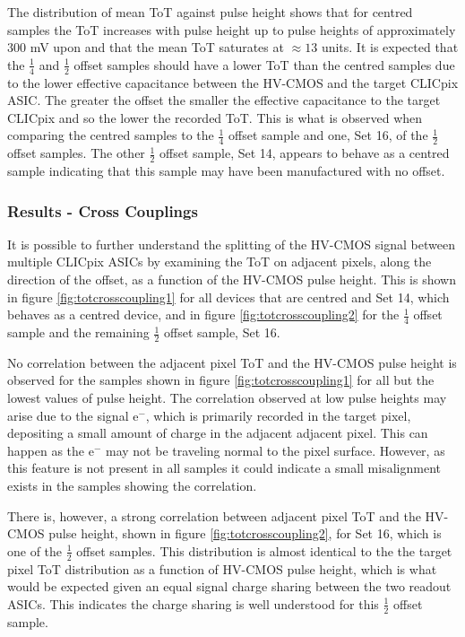 The distribution of mean ToT against pulse height shows that for centred samples the ToT increases with pulse height up to pulse heights of approximately 300 mV upon and that the mean ToT saturates at $\approx 13$ units.  It is expected that the $\frac{1}{4}$ and $\frac{1}{2}$ offset samples should have a lower ToT than the centred samples due to the lower effective capacitance between the HV-CMOS and the target CLICpix ASIC.  The greater the offset the smaller the effective capacitance to the target CLICpix and so the lower the recorded ToT.  This is what is observed when comparing the centred samples to the $\frac{1}{4}$ offset sample and one, Set 16, of the $\frac{1}{2}$ offset samples.  The other $\frac{1}{2}$ offset sample, Set 14, appears to behave as a centred sample indicating that this sample may have been manufactured with no offset.  


\subsubsection{Results -  Cross Couplings}
It is possible to further understand the splitting of the HV-CMOS signal between multiple CLICpix ASICs by examining the ToT on adjacent pixels, along the direction of the offset, as a function of the HV-CMOS pulse height.  This is shown in figure \ref{fig:totcrosscoupling1} for all devices that are centred and Set 14, which behaves as a centred device, and in figure \ref{fig:totcrosscoupling2} for the $\frac{1}{4}$ offset sample and the remaining $\frac{1}{2}$ offset sample, Set 16.  

No correlation between the adjacent pixel ToT and the HV-CMOS pulse height is observed for the samples shown in figure \ref{fig:totcrosscoupling1} for all but the lowest values of pulse height.  The correlation observed at low pulse heights may arise due to the signal $\text{e}^{-}$, which is primarily recorded in the target pixel, depositing a small amount of charge in the adjacent adjacent pixel.  This can happen as the $\text{e}^{-}$ may not be traveling normal to the pixel surface.  However, as this feature is not present in all samples it could indicate a small misalignment exists in the samples showing the correlation.  

There is, however, a strong correlation between adjacent pixel ToT and the HV-CMOS pulse height, shown in figure \ref{fig:totcrosscoupling2}, for Set 16, which is one of the $\frac{1}{2}$ offset samples.  This distribution is almost identical to the the target pixel ToT distribution as a function of HV-CMOS pulse height, which is what would be expected given an equal signal charge sharing between the two readout ASICs.  This indicates the charge sharing is well understood for this $\frac{1}{2}$ offset sample.   

